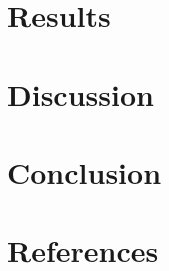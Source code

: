 \documentclass{article}
\begin{document}
\section{Results}
\section{Discussion}
\section{Conclusion}
\section{References}

\end{document}
